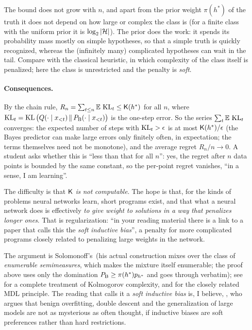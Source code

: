 \begin{intuition}
The bound does not grow with $n$, and apart from the prior weight $\pi(h^*)$ of the truth it does not depend on how large or complex the class is (for a finite class with the uniform prior it is $\log_2\left\lvert \mathcal H\right\rvert$). The prior does the work: it spends its probability mass mostly on simple hypotheses, so that a simple truth is quickly recognized, whereas the (infinitely many) complicated hypotheses can wait in the tail. Compare with the classical heuristic, in which complexity of the class itself is penalized; here the class is unrestricted and the penalty is \emph{soft}.
\end{intuition}

\paragraph{Consequences.} By the chain rule, $R_n=\sum_{t\le n}\mathbb{E}\,\operatorname{KL}_t\le\mathsf{K}(h^*)$ for all $n$, where $\operatorname{KL}_t=\operatorname{KL}\big(Q(\cdot\mid x_{<t})\,\|\,P_{\mathrm{B}}(\cdot\mid x_{<t})\big)$ is the one-step error. So the series $\sum_t\mathbb{E}\,\operatorname{KL}_t$ converges: the expected number of steps with $\operatorname{KL}_t>\epsilon$ is at most $\mathsf{K}(h^*)/\epsilon$ (the Bayes predictor can make large errors only finitely often, in expectation; the terms themselves need not be monotone), and the average regret $R_n/n\to0$. A student asks whether this is ``less than that for all $n$'': yes, the regret after $n$ data points is bounded by the same constant, so the per-point regret vanishes, ``in a sense, I am learning''.

\begin{caution}
The difficulty is that \emph{$\mathsf{K}$ is not computable}. The hope is that, for the kinds of problems neural networks learn, short programs exist, and that what a neural network does is effectively \emph{to give weight to solutions in a way that penalizes longer ones}. That is regularization: ``in your reading material there is a link to a paper that calls this the \emph{soft inductive bias}'', a penalty for more complicated programs closely related to penalizing large weights in the network.
\end{caution}

\begin{beyond}
The argument is Solomonoff's\,\citep{solomonoff1964,solomonoff1978} (his actual construction mixes over the class of \emph{enumerable semimeasures}, which makes the mixture itself enumerable; the proof above uses only the domination $P_{\mathrm{B}}\ge\pi(h^*)p_{h^*}$ and goes through verbatim); see \citet{li2019} for a complete treatment of Kolmogorov complexity, and \citet{grunwald2007} for the closely related MDL principle. The reading that calls it a \emph{soft inductive bias} is, I believe, \citet{wilson2025}, who argues that benign overfitting, double descent and the generalization of large models are not as mysterious as often thought, if inductive biases are soft preferences rather than hard restrictions.
\end{beyond}


